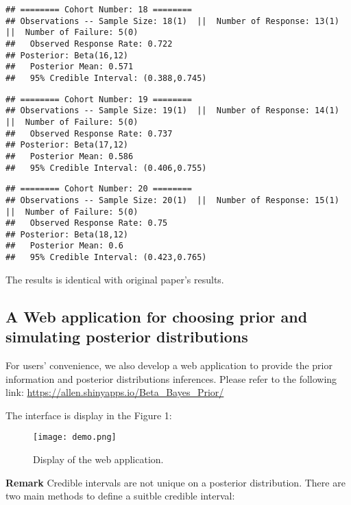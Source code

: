 \documentclass[]{article}
\begin{document}
\begin{verbatim}
## ======== Cohort Number: 18 ======== 
## Observations -- Sample Size: 18(1)  ||  Number of Response: 13(1)  ||  Number of Failure: 5(0)
##   Observed Response Rate: 0.722
## Posterior: Beta(16,12) 
##   Posterior Mean: 0.571
##   95% Credible Interval: (0.388,0.745)
\end{verbatim}

\begin{verbatim}
## ======== Cohort Number: 19 ======== 
## Observations -- Sample Size: 19(1)  ||  Number of Response: 14(1)  ||  Number of Failure: 5(0)
##   Observed Response Rate: 0.737
## Posterior: Beta(17,12) 
##   Posterior Mean: 0.586
##   95% Credible Interval: (0.406,0.755)
\end{verbatim}

\begin{verbatim}
## ======== Cohort Number: 20 ======== 
## Observations -- Sample Size: 20(1)  ||  Number of Response: 15(1)  ||  Number of Failure: 5(0)
##   Observed Response Rate: 0.75
## Posterior: Beta(18,12) 
##   Posterior Mean: 0.6
##   95% Credible Interval: (0.423,0.765)
\end{verbatim}


The results is identical with original paper's results.

\subsection{A Web application for choosing prior and simulating
posterior
distributions}\label{a-web-application-for-choosing-prior-and-simulating-posterior-distributions}

For users' convenience, we also develop a web application to provide the
prior information and posterior distributions inferences. Please refer
to the following link:
\url{https://allen.shinyapps.io/Beta_Bayes_Prior/}

The interface is display in the Figure 1:

\begin{figure}[htbp]
\centering
\texttt{[image: demo.png]}
\caption{Display of the web application.}
\end{figure}

\textbf{Remark} Credible intervals are not unique on a posterior
distribution. There are two main methods to define a suitble credible
interval:
\end{document}
